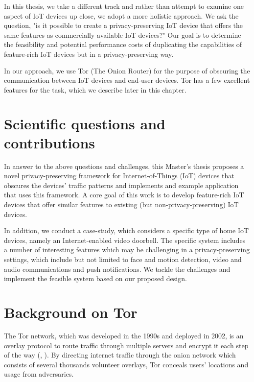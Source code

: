 In this thesis, we take a different track and rather than attempt to examine one aspect of IoT devices up close, we adopt a more holistic approach. We ask the question, "is it possible to create a privacy-preserving IoT device that offers the same features as commercially-available IoT devices?" Our goal is to determine the feasibility and potential performance costs of duplicating the capabilities of feature-rich IoT devices but in a privacy-preserving way.

In our approach, we use Tor (The Onion Router) for the purpose of obscuring the communication between IoT devices and end-user devices. Tor has a few excellent features for the task, which we describe later in this chapter.

\section{Scientific questions and contributions}

In answer to the above questions and challenges, this Master's thesis proposes a novel privacy-preserving framework for Internet-of-Things (IoT) devices that obscures the devices' traffic patterns and implements and example application that uses this framework. A core goal of this work is to develop feature-rich IoT devices that offer similar features to existing (but non-privacy-preserving) IoT devices.

In addition, we conduct a case-study, which considers a specific type of home IoT devices, namely an Internet-enabled video doorbell. The specific system includes a number of interesting features which may be challenging in a privacy-preserving settings, which include but not limited to face and motion detection, video and audio communications and push notifications. We tackle the challenges and implement the feasible system based on our proposed design.

\section{Background on Tor}
\label{sec:torbackground}
The Tor network, which was developed in the 1990s and deployed in 2002, is an overlay protocol to route traffic through multiple servers and encrypt it each step of the way (\cite{torproject}, \cite{chaabane2010digging}). By directing internet traffic through the onion network which consists of several thousands volunteer overlays, Tor conceals users' locations and usage from adversaries.

